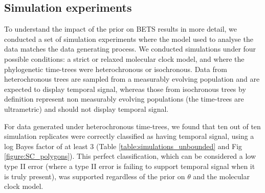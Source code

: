 \documentclass[10pt,letterpaper]{article}
\begin{document}
\subsection*{Simulation experiments}
To understand the impact of the prior on BETS results in more detail, we conducted a set of simulation experiments where the model used to analyse the data matches the data generating process. We conducted simulations under four possible conditions: a strict or relaxed molecular clock model, and where the phylogenetic time-trees were heterochronous or isochronous. Data from heterochronous trees are sampled from a measurably evolving population and are expected to display temporal signal, whereas those from isochronous trees by definition represent non measurably evolving populations (the time-trees are ultrametric) and should not display temporal signal. 

For data generated under heterochronous time-trees, we found that ten out of ten simulation replicates were correctly classified as having temporal signal, using a log Bayes factor of at least 3 (Table \ref{table:simulations_unbounded} and Fig \ref{figure:SC_polygons}). This perfect classification, which can be considered a low type II error (where a type II error is failing to support temporal signal when it is truly present), was supported regardless of the prior on $\theta$ and the molecular clock model. 
\end{document}
